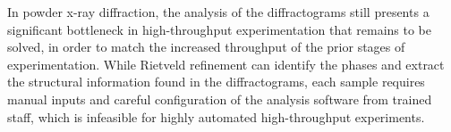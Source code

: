 








In powder x-ray diffraction, the analysis of the diffractograms still presents a significant bottleneck in high-throughput experimentation that remains to be solved, in order to match the increased throughput of the prior stages of experimentation. While Rietveld refinement can identify the phases and extract the structural information found in the diffractograms, each sample requires manual inputs and careful configuration of the analysis software from trained staff, which is infeasible for highly automated high-throughput experiments.

